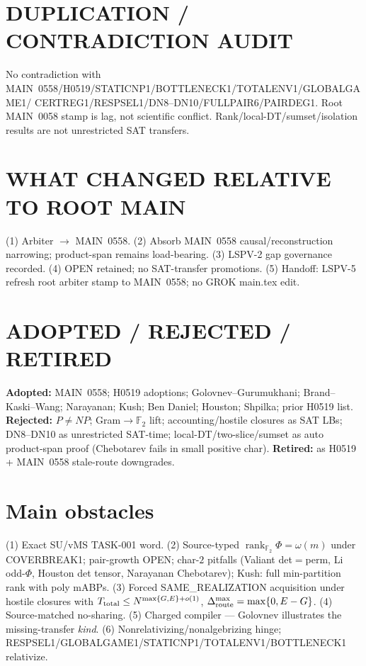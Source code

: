 \documentclass[11pt]{article}
\begin{document}
\section*{DUPLICATION / CONTRADICTION AUDIT}
No contradiction with MAIN~0558/H0519/STATICNP1/BOTTLENECK1/TOTALENV1/GLOBALGAME1/
CERTREG1/RESPSEL1/DN8--DN10/FULLPAIR6/PAIRDEG1. Root MAIN~0058 stamp is lag, not
scientific conflict. Rank/local-DT/sumset/isolation results are not unrestricted
SAT transfers.

\section*{WHAT CHANGED RELATIVE TO ROOT MAIN}
(1) Arbiter $\to$ MAIN~0558. (2) Absorb MAIN~0558 causal/reconstruction narrowing;
product-span remains load-bearing. (3) LSPV-2 gap governance recorded. (4) OPEN
retained; no SAT-transfer promotions. (5) Handoff: LSPV-5 refresh root arbiter
stamp to MAIN~0558; no GROK main.tex edit.

\section*{ADOPTED / REJECTED / RETIRED}
\textbf{Adopted:} MAIN~0558; H0519 adoptions; Golovnev--Gurumukhani; Brand--Kaski--Wang;
Narayanan; Kush; Ben Daniel; Houston; Shpilka; prior H0519 list.
\textbf{Rejected:} $P\neq NP$; Gram$\to\mathbb F_2$ lift; accounting/hostile closures as
SAT LBs; DN8--DN10 as unrestricted SAT-time; local-DT/two-slice/sumset as auto
product-span proof (Chebotarev fails in small positive char).
\textbf{Retired:} as H0519 + MAIN~0558 stale-route downgrades.

\section*{Main obstacles}
(1) Exact SU/vMS TASK-001 word. (2) Source-typed
$\operatorname{rank}_{\mathbb F_2}\Phi=\omega(m)$ under COVERBREAK1; pair-growth
OPEN; char-$2$ pitfalls (Valiant det$=$perm, Li odd-$\Phi$, Houston det tensor,
Narayanan Chebotarev); Kush: full min-partition rank with poly mABPs.
(3) Forced SAME\_REALIZATION acquisition under hostile closures with
$T_{\rm total}\le N^{\max\{G,E\}+o(1)}$, $\Delta_{\rm route}^{\max}=\max\{0,E-G\}$.
(4) Source-matched no-sharing. (5) Charged compiler --- Golovnev illustrates the
missing-transfer \emph{kind}. (6) Nonrelativizing/nonalgebrizing hinge;
RESPSEL1/GLOBALGAME1/STATICNP1/TOTALENV1/BOTTLENECK1 relativize.
\end{document}
